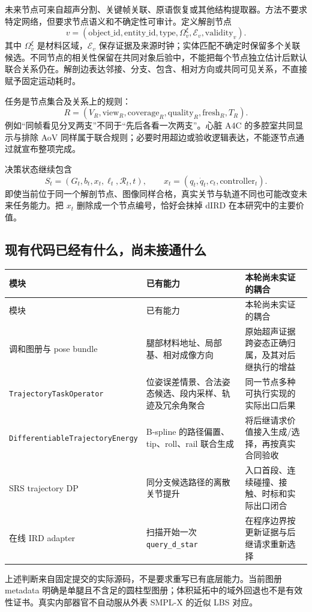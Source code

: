 \documentclass[11pt,a4paper,fontset=fandol]{ctexart}
\theoremstyle{definition}
\theoremstyle{remark}\newtheorem{remark}[theorem]{说明}
\numberwithin{equation}{section}
\begin{document}
未来节点可来自超声分割、关键帧关联、原语恢复或其他结构提取器。方法不要求特定网络，但要求节点语义和不确定性可审计。定义解剖节点
\begin{equation}
 v=(\mathrm{object\_id},\mathrm{entity\_id},\mathrm{type},
 \Omega_v^\xi,\mathcal E_v,\mathrm{validity}_v).
\end{equation}
其中 $\Omega_v^\xi$ 是材料区域，$\mathcal E_v$ 保存证据及来源时钟；实体匹配不确定时保留多个关联候选。不同节点的相关性保留在共同对象后验中，不能把每个节点独立估计后默认联合关系仍在。解剖边表达邻接、分支、包含、相对方向或共同可见关系，不直接赋予固定运动耗时。

任务是节点集合及关系上的规则：
\begin{equation}
 R=(V_R,\mathrm{view}_R,\mathrm{coverage}_R,
 \mathrm{quality}_R,\mathrm{fresh}_R,T_R).
\end{equation}
例如“同帧看见分叉两支”不同于“先后各看一次两支”。心脏 A4C 的多腔室共同显示与排除 AoV 同样属于联合规则；必要时用超边或验收逻辑表达，不能逐节点通过就宣布整项完成。

决策状态继续包含
\begin{equation}
 S_t=(G_t,b_t,x_t,\ell_t,\mathcal R_t,t),
 \qquad x_t=(q_t,\dot q_t,c_t,\mathrm{controller}_t).
\end{equation}
即使当前位于同一个解剖节点、图像同样合格，真实关节与轨道不同也可能改变未来任务能力。把 $x_t$ 删除成一个节点编号，恰好会抹掉 dIRD 在本研究中的主要价值。

\subsection{现有代码已经有什么，尚未接通什么}
\begin{longtable}{P{.25\linewidth}P{.34\linewidth}P{.31\linewidth}}
\toprule 模块 & 已有能力 & 本轮尚未实证的耦合\\\midrule
\endfirsthead
\toprule 模块 & 已有能力 & 本轮尚未实证的耦合\\\midrule
\endhead
调和图册与 pose bundle & 腿部材料地址、局部基、相对成像方向 & 原始超声证据跨姿态正确归属，及其对后继执行的增益\\
\texttt{TrajectoryTask}\newline\texttt{Operator} & 位姿误差情景、合法姿态候选、段内采样、轨迹及冗余角聚合 & 同一节点多种可执行实现的实际出口后果\\
\texttt{Differentiable}\newline\texttt{TrajectoryEnergy} & B-spline 的路径偏置、tip、roll、rail 联合生成 & 将后继请求价值接入生成/选择，再按真实合同验收\\
SRS trajectory DP & 同分支候选路径的离散关节提升 & 入口首段、连续碰撞、接触、时标和实际出口闭合\\
在线 IRD adapter & 扫描开始一次 \texttt{query\_d\_star} & 在程序边界按更新证据与后继请求重新选择\\
\bottomrule
\end{longtable}
上述判断来自固定提交的实际源码\cite{graphatlas,graphpose,graphdird,graphenergy,graphsrs,graphadapter}，不是要求重写已有底层能力。当前图册 metadata 明确是单腿且不含足的圆柱型图册；体积延拓中的域外回退也不是有效性证书。真实内部器官不自动服从外表 SMPL-X 的近似 LBS 对应。
\end{document}
